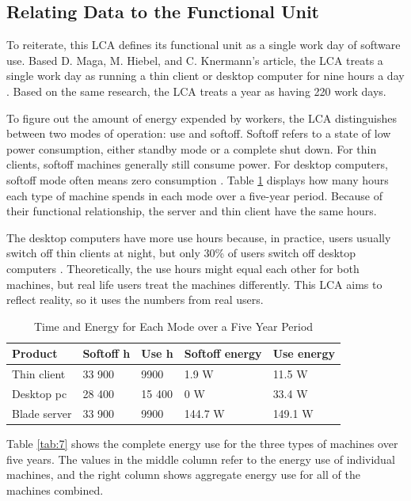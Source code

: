 \documentclass[final,journal,10pt,letterpaper,oneside,twocolumn,compsoc]%
{IEEEtran}
\begin{document}
\subsection{Relating Data to the Functional Unit}
To reiterate, this LCA defines its functional
unit as a single work day of software use. Based D. Maga, M. Hiebel, and C.
Knermann's article, the LCA treats a single work day as running a thin
client or desktop computer for nine hours a day \cite{maga}. Based on the same
research, the LCA treats a year as having 220 work days.

To figure out the amount of energy expended by workers, the LCA distinguishes
between two modes of operation: use and softoff. Softoff refers to a state of
low power consumption, either standby mode or a complete shut down. For thin
clients,
softoff machines generally still consume power. For desktop
computers, softoff mode often means zero consumption \cite{client}. Table
\ref{tab:6}
displays how many hours each type of machine spends in each mode over a
five-year period. Because of their functional relationship, the server and thin
client have the same hours.

The desktop computers have more use hours because, in practice, users usually
switch off thin clients at night, but only 30\% of users switch off desktop
computers \cite{client}. Theoretically, the use hours might equal each other for
both
machines, but real life users treat the machines differently. This LCA aims to
reflect reality, so it uses the numbers from real users.

\begin{table}[t!]
  \caption{Time and Energy for Each Mode over a Five Year Period}
  \label{tab:6}
  \centering
    \begin{tabular}{| l | l | l | l | l |}
      \hline
      Product & Softoff h & Use h & Softoff energy & Use energy \\
      \hline
      Thin client  & 33 900 & 9900  & 1.9 W   & 11.5 W \\
      Desktop pc   & 28 400 & 15 400 & 0 W     & 33.4 W \\
      Blade server & 33 900 & 9900  & 144.7 W & 149.1 W \\
      \hline
    \end{tabular}
\end{table}

Table \ref{tab:7} shows the complete energy use for the three types of machines
over five years. The values in the middle column refer to the energy use of
individual machines, and the right column shows aggregate energy use for all of
the machines combined.
\end{document}
